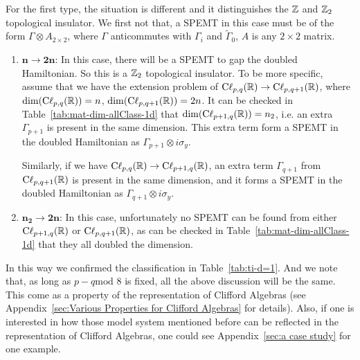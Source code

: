 \begin{enumerate}
    For the first type, the situation is different and it distinguishes the $\mathbb{Z}$
    and $\mathbb{Z}_2$ topological insulator. We first not that, a SPEMT in this case
    must be of the form $\Gamma\otimes A_{2\times 2}$, where $\Gamma$
    anticommutes with $\Gamma_i$ and $\tilde{\Gamma}_0$, $A$ is any $2\times 2$
    matrix.
    \begin{enumerate}
        \item $\mathbf{n\to 2n}$: In this case, there will be a SPEMT to gap
            the doubled Hamiltonian. So this is a $\mathbb{Z}_2$ topological insulator.
            To be more specific, assume that we have the extension problem of
            $\mathrm{C\ell}_{p,q}(\mathbb{R})\to\mathrm{C\ell}_{p,q+1}(\mathbb{R})$, where
            $\mathrm{dim}(\mathrm{C\ell}_{p,q}(\mathbb{R}))=n$,
            $\mathrm{dim}(\mathrm{C\ell}_{p,q+1}(\mathbb{R}))=2n$. It can be checked in
            Table~\ref{tab:mat-dim-allClass-1d} that
            $\mathrm{dim}(\mathrm{C\ell}_{p+1,q}(\mathbb{R}))=n_2$, i.e. an extra
            $\Gamma_{p+1}$ is present in the same dimension. This extra term
            form a SPEMT in the doubled Hamiltonian as $\Gamma_{p+1}\otimes
            i\sigma_y$.

            Similarly, if we have $\mathrm{C\ell}_{p,q}(\mathbb{R})\to
            \mathrm{C\ell}_{p+1,q}(\mathbb{R})$, an extra term $\Gamma_{q+1}$ from
            $\mathrm{C\ell}_{p,q+1}(\mathbb{R})$ is present in the same dimension, and
            it forms a SPEMT in the doubled Hamiltonian as $\Gamma_{q+1}\otimes
            i\sigma_y$.
        \item $\mathbf{n_2\to 2n}$: In this case, unfortunately no SPEMT can be
            found from either $\mathrm{C\ell}_{p+1,q}(\mathbb{R})$ or
            $\mathrm{C\ell}_{p,q+1}(\mathbb{R})$, as can be checked in
            Table~\ref{tab:mat-dim-allClass-1d} that they all doubled the
            dimension.
    \end{enumerate}
\end{enumerate}

In this way we confirmed the classification in Table~\ref{tab:ti-d=1}. And we
note that, as long as $p-q \text{mod 8}$ is fixed, all the above discussion will
be the same. This come as a property of the representation of Clifford Algebras
(see Appendix~\ref{sec:Various Properties for Clifford Algebras} for details).
Also, if one is interested in how those model system mentioned before can be
reflected in the representation of Clifford Algebras, one could see
Appendix~\ref{sec:a case study} for one example.

